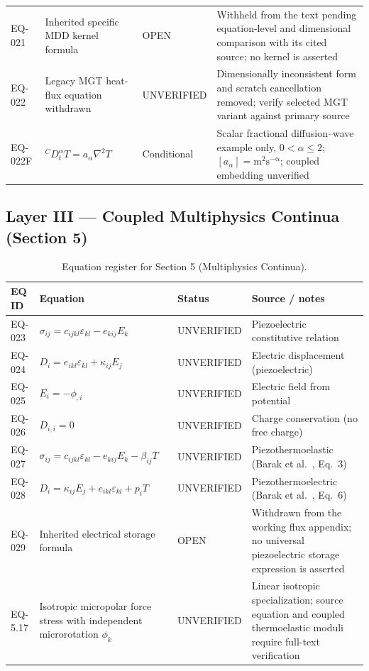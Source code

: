 \begin{table}[htbp]
\begin{tabularx}{\textwidth}{@{}p{1.6cm}Y p{2.8cm}Y@{}}
EQ-021 & Inherited specific MDD kernel formula & OPEN & Withheld from the text pending equation-level and dimensional comparison with its cited source; no kernel is asserted \\
EQ-022 & Legacy MGT heat-flux equation withdrawn & UNVERIFIED & Dimensionally inconsistent form and scratch cancellation removed; verify selected MGT variant against primary source \\
EQ-022F & ${}^C D_t^\alpha T = a_\alpha\nabla^2T$ & Conditional & Scalar fractional diffusion--wave example only, $0<\alpha\leq2$; $[a_\alpha]=\mathrm{m^2s^{-\alpha}}$; coupled embedding unverified \\
\bottomrule
\end{tabularx}
\end{table}

\subsection{Layer III — Coupled Multiphysics Continua (Section 5)}

\begin{table}[htbp]
\centering
\small
\setlength{\tabcolsep}{3pt}
\caption{Equation register for Section 5 (Multiphysics Continua).}
\label{tab:appA-sec5}
\begin{tabularx}{\textwidth}{@{}p{1.6cm}Y p{2.8cm}Y@{}}
\toprule
\textbf{EQ ID} & \textbf{Equation} & \textbf{Status} & \textbf{Source / notes} \\
\midrule
EQ-023 & $\sigma_{ij} = c_{ijkl}\varepsilon_{kl} - e_{kij}E_k$ & UNVERIFIED & Piezoelectric constitutive relation \\
EQ-024 & $D_i = e_{ikl}\varepsilon_{kl} + \kappa_{ij}E_j$ & UNVERIFIED & Electric displacement (piezoelectric) \\
EQ-025 & $E_i = -\phi_{,i}$ & UNVERIFIED & Electric field from potential \\
EQ-026 & $D_{i,i} = 0$ & UNVERIFIED & Charge conservation (no free charge) \\
EQ-027 & $\sigma_{ij} = c_{ijkl}\varepsilon_{kl} - e_{kij}E_k - \beta_{ij}T$ & UNVERIFIED & Piezothermoelastic (Barak et al.~\cite{Barak2023}, Eq.~3) \\
EQ-028 & $D_i = \kappa_{ij}E_j + e_{ikl}\varepsilon_{kl} + p_i T$ & UNVERIFIED & Piezothermoelectric (Barak et al.~\cite{Barak2023}, Eq.~6) \\
EQ-029 & Inherited electrical storage formula & OPEN & Withdrawn from the working flux appendix; no universal piezoelectric storage expression is asserted \\
EQ-5.17 & Isotropic micropolar force stress with independent microrotation $\phi_k$ & UNVERIFIED & Linear isotropic specialization; source equation and coupled thermoelastic moduli require full-text verification \\
\bottomrule
\end{tabularx}
\end{table}

